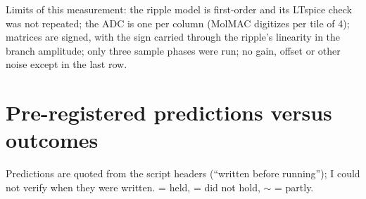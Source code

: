 \documentclass[11pt]{article}
\newcommand{\ok}{\ding{51}}
\newcommand{\no}{\ding{55}}
\newcommand{\partly}{$\sim$}
\begin{document}
Limits of this measurement: the ripple model is first-order and its LTspice check was not repeated; the ADC is one per column (MolMAC digitizes per tile of 4); matrices are signed, with the sign carried through the ripple's linearity in the branch amplitude; only three sample phases were run; no gain, offset or other noise except in the last row.

\section{Pre-registered predictions versus outcomes}\label{sec:prereg}

Predictions are quoted from the script headers (``written before running''); I could not verify when they were written. \ok{} = held, \no{} = did not hold, \partly{} = partly.
\end{document}
